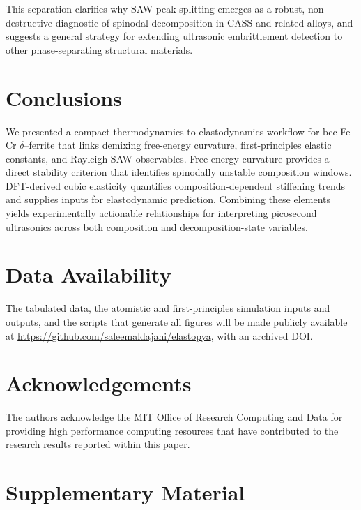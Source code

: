 \documentclass[final,3p,times]{elsarticle}
\begin{document}
This separation clarifies why SAW peak splitting emerges as a robust, non-destructive diagnostic of spinodal decomposition in CASS and related alloys, and suggests a general strategy for extending ultrasonic embrittlement detection to other phase-separating structural materials.


\section{Conclusions}
We presented a compact thermodynamics-to-elastodynamics workflow for bcc Fe--Cr $\delta$--ferrite that links demixing free-energy curvature, first-principles elastic constants, and Rayleigh SAW observables. Free-energy curvature provides a direct stability criterion that identifies spinodally unstable composition windows. DFT-derived cubic elasticity quantifies composition-dependent stiffening trends and supplies inputs for elastodynamic prediction. Combining these elements yields experimentally actionable relationships for interpreting picosecond ultrasonics across both composition and decomposition-state variables.

\section*{Data Availability}
The tabulated data, the atomistic and first-principles simulation inputs and outputs, and the scripts that generate all figures will be made publicly available at \url{https://github.com/saleemaldajani/elastopya}, with an archived DOI.


\section*{Acknowledgements}
The authors acknowledge the MIT Office of Research Computing and Data for providing high performance computing resources that have contributed to the research results reported within this paper.





\newpage
\clearpage

\section*{Supplementary Material}

\setcounter{figure}{0}
\renewcommand{\thefigure}{S\arabic{figure}}
\renewcommand{\thetable}{S\arabic{table}}
\end{document}
